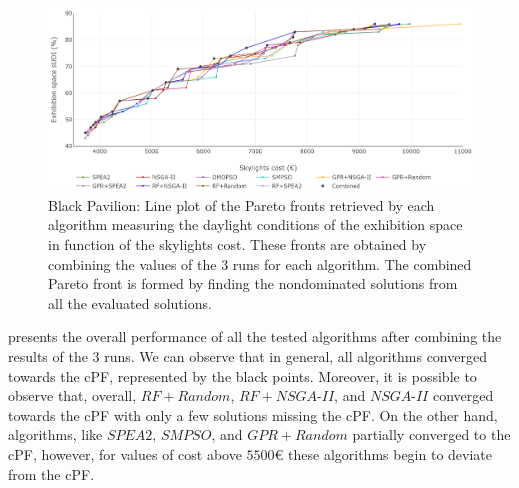 
\begin{figure}[htbp]
	\centering
	\includegraphics[width=\textwidth]{Images/Evaluation/BlackPavilion/All_Algorithms_all_runs-2019-04-16.png}
	\caption[Black Pavilion: Pareto front plot]{Black Pavilion: Line plot of the Pareto fronts retrieved by each algorithm measuring the daylight conditions of the exhibition space in function of the skylights cost. These fronts are obtained by combining the values of the $3$ runs for each algorithm. The combined Pareto front is formed by finding the nondominated solutions from all the evaluated solutions.}
	\label{fig:blackpavilionallruns}
\end{figure}

 presents the overall performance of all the tested algorithms after combining the results of the $3$ runs. We can observe that in general, all algorithms converged towards the \ac{cPF}, represented by the black points. Moreover, it is possible to observe that, overall, $RF+Random$, $RF+NSGA$-$II$, and $NSGA$-$II$ converged towards the \ac{cPF} with only a few solutions missing the \ac{cPF}. On the other hand, algorithms, like $SPEA2$, $SMPSO$, and $GPR+Random$ partially converged to the \ac{cPF}, however, for values of cost above $5500$€ these algorithms begin to deviate from the \ac{cPF}.

